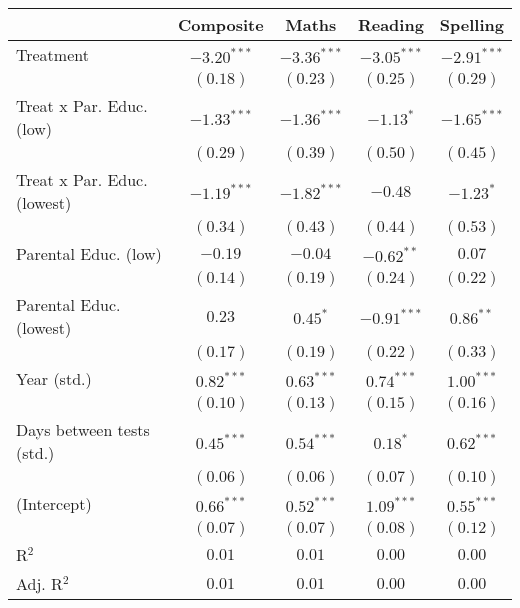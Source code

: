 
\begin{table}
\begin{center}
\begin{tabular}{l c c c c}
\hline
 & Composite & Maths & Reading & Spelling \\
\hline
Treatment                   & $-3.20^{***}$ & $-3.36^{***}$ & $-3.05^{***}$ & $-2.91^{***}$ \\
                            & $(0.18)$      & $(0.23)$      & $(0.25)$      & $(0.29)$      \\
Treat x Par. Educ. (low)    & $-1.33^{***}$ & $-1.36^{***}$ & $-1.13^{*}$   & $-1.65^{***}$ \\
                            & $(0.29)$      & $(0.39)$      & $(0.50)$      & $(0.45)$      \\
Treat x Par. Educ. (lowest) & $-1.19^{***}$ & $-1.82^{***}$ & $-0.48$       & $-1.23^{*}$   \\
                            & $(0.34)$      & $(0.43)$      & $(0.44)$      & $(0.53)$      \\
Parental Educ. (low)        & $-0.19$       & $-0.04$       & $-0.62^{**}$  & $0.07$        \\
                            & $(0.14)$      & $(0.19)$      & $(0.24)$      & $(0.22)$      \\
Parental Educ. (lowest)     & $0.23$        & $0.45^{*}$    & $-0.91^{***}$ & $0.86^{**}$   \\
                            & $(0.17)$      & $(0.19)$      & $(0.22)$      & $(0.33)$      \\
Year (std.)                 & $0.82^{***}$  & $0.63^{***}$  & $0.74^{***}$  & $1.00^{***}$  \\
                            & $(0.10)$      & $(0.13)$      & $(0.15)$      & $(0.16)$      \\
Days between tests (std.)   & $0.45^{***}$  & $0.54^{***}$  & $0.18^{*}$    & $0.62^{***}$  \\
                            & $(0.06)$      & $(0.06)$      & $(0.07)$      & $(0.10)$      \\
(Intercept)                 & $0.66^{***}$  & $0.52^{***}$  & $1.09^{***}$  & $0.55^{***}$  \\
                            & $(0.07)$      & $(0.07)$      & $(0.08)$      & $(0.12)$      \\
\hline
R$^2$                       & $0.01$        & $0.01$        & $0.00$        & $0.00$        \\
Adj. R$^2$                  & $0.01$        & $0.01$        & $0.00$        & $0.00$        \\

\end{tabular}
\end{center}
\end{table}

